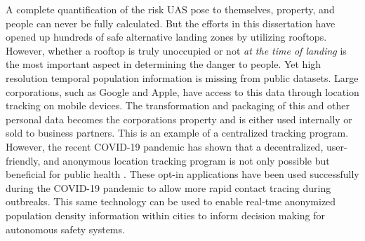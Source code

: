 A complete quantification of the risk \ac{UAS} pose to themselves, property, and people can never be fully calculated. But the efforts in this dissertation have opened up hundreds of safe alternative landing zones by utilizing rooftops. However, whether a rooftop is truly unoccupied or not \emph{at the time of landing} is the most important aspect in determining the danger to people. Yet high resolution temporal population information is missing from public datasets. Large corporations, such as Google and Apple, have access to this data through location tracking on mobile devices. The transformation and packaging of this and other personal data becomes the corporations property and is either used internally or sold to business partners. This is an example of a centralized tracking program.
However, the recent COVID-19 pandemic has shown that a decentralized, user-friendly, and anonymous location tracking program is not only possible but beneficial for public health \cite{cohen_digital_2020, lee_benefits_2021}. These opt-in applications have been used successfully during the COVID-19 pandemic to allow more rapid contact tracing during outbreaks. This same technology can be used to enable real-tme anonymized population density information within cities to inform decision making for autonomous safety systems.








